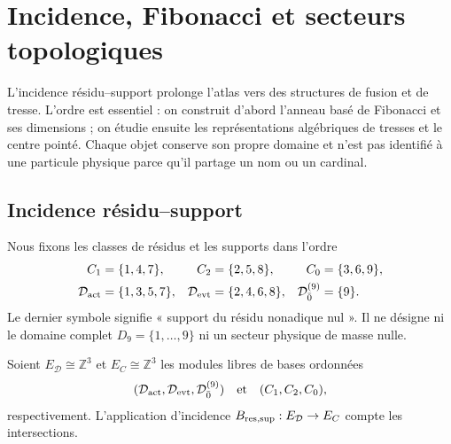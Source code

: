 \chapter[Incidence et secteurs topologiques]{Incidence, Fibonacci et secteurs topologiques}
\label{chap:incidencia-fibonacci-topologia}

L’incidence résidu--support prolonge l’atlas vers des structures de fusion et de tresse. L’ordre est essentiel : on construit d’abord l’anneau basé de Fibonacci et ses dimensions ; on étudie ensuite les représentations algébriques de tresses et le centre pointé. Chaque objet conserve son propre domaine et n’est pas identifié à une particule physique parce qu’il partage un nom ou un cardinal.

\section{Incidence résidu--support}
\label{sec:incidencia-residuo-soporte}

Nous fixons les classes de résidus et les supports dans l’ordre
\[
 \begin{aligned}
 C_1&=\{1,4,7\},&
 C_2&=\{2,5,8\},&
 C_0&=\{3,6,9\},\\
 \mathcal D_{\rm act}&=\{1,3,5,7\},&
 \mathcal D_{\rm evt}&=\{2,4,6,8\},&
 \mathcal D_{\bar0}^{(9)}&=\{9\}.
 \end{aligned}
\]
Le dernier symbole signifie « support du résidu nonadique nul ». Il ne désigne ni le domaine complet \(D_9=\{1,\ldots,9\}\) ni un secteur physique de masse nulle.

Soient \(E_{\mathcal D}\cong\mathbb Z^3\) et \(E_C\cong\mathbb Z^3\) les modules libres de bases ordonnées
\[
 (\mathcal D_{\rm act},\mathcal D_{\rm evt},
   \mathcal D_{\bar0}^{(9)})
 \quad\text{et}\quad
 (C_1,C_2,C_0),
\]
respectivement. L’application d’incidence \(B_{\rm res,sup}:E_{\mathcal D}\to E_C\) compte les intersections.

